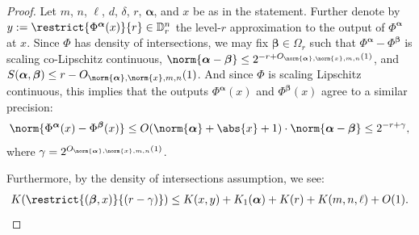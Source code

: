 \begin{proof}
Let $m$, $n$, $\ell$, $d$, $\delta$, $r$, $\boldsymbol{\alpha}$, and $x$ be as in the statement. Further denote by $y := \restrict{\Phi^{\boldsymbol{\alpha}}(x)}{r} \in \mathbb{D}^n_r$ the level-$r$ approximation to the output of $\Phi^{\boldsymbol{\alpha}}$ at $x$. Since $\Phi$ has density of intersections, we may fix $\boldsymbol{\beta} \in \Omega_r$ such that $\Phi^{\boldsymbol{\alpha}} - \Phi^{\boldsymbol{\beta}}$ is scaling co-Lipschitz continuous, $\norm{\boldsymbol{\alpha} - \boldsymbol{\beta}} \leq 2^{-r + O_{\norm{\boldsymbol{\alpha}}, \norm{x}, m, n}(1)}$, and $S(\boldsymbol{\alpha}, \boldsymbol{\beta}) \leq r - O_{\norm{\boldsymbol{\alpha}}, \norm{x}, m, n}(1)$. And since $\Phi$ is scaling Lipschitz continuous, this implies that the outputs $\Phi^{\boldsymbol{\alpha}}(x)$ and $\Phi^{\boldsymbol{\beta}}(x)$ agree to a similar precision:
\begin{align*}
    \norm{\Phi^{\boldsymbol{\alpha}}(x) - \Phi^{\boldsymbol{\beta}}(x)} \leq O(\norm{\boldsymbol{\alpha}} + \abs{x} + 1) \cdot \norm{\boldsymbol{\alpha} - \boldsymbol{\beta}} \leq 2^{-r + \gamma},
\end{align*}
where $\gamma = 2^{O_{\norm{\boldsymbol{\alpha}}, \norm{x}, m, n}(1)}$.

Furthermore, by the density of intersections assumption, we see:
\begin{align}
    \label{equation:u_v_x_computed}
    K(\restrict{(\boldsymbol{\beta}, x)}{(r - \gamma)}) \leq K(x, y) + K_1(\boldsymbol{\alpha}) + K(r) + K(m, n, \ell) + O(1).
\end{align}


\end{proof}

